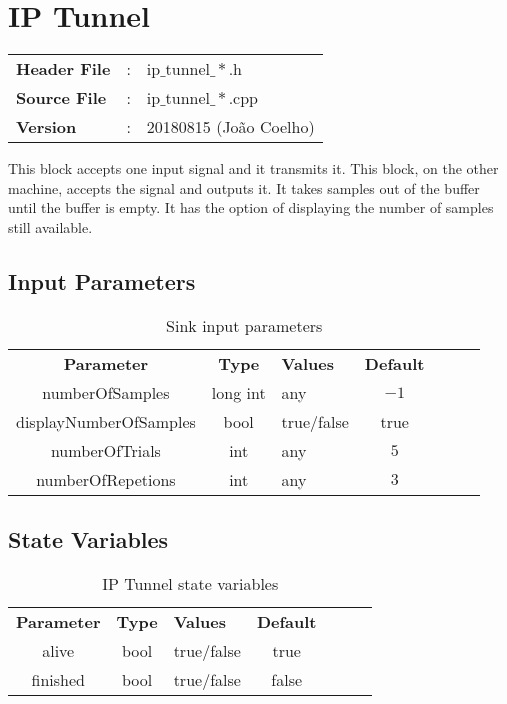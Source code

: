 \clearpage

\section{IP Tunnel}

\begin{tcolorbox}	
	\begin{tabular}{p{2.75cm} p{0.2cm} p{10.5cm}} 	
		\textbf{Header File}   &:& ip$\_$tunnel$\_*$.h \\
		\textbf{Source File}   &:& ip$\_$tunnel$\_*$.cpp \\
        \textbf{Version}       &:& 20180815 (Jo\~ao Coelho) \\
	\end{tabular}
\end{tcolorbox}

This block accepts one input signal and it transmits it. This block, on the other machine, accepts the signal and outputs it. It takes samples out of the buffer until the buffer is empty. It has the option of displaying the number of samples still available.

\subsection*{Input Parameters}

\begin{table}[h]
	\centering
	\begin{tabular}{|c|c|p{30mm}|c|ccp{60mm}}
		\cline{1-4}
		\textbf{Parameter} & \textbf{Type} & \textbf{Values} &   \textbf{Default}& \\ \cline{1-4}
		numberOfSamples & long int & any & $-1$ \\ \cline{1-4}
        displayNumberOfSamples & bool & true/false & true \\ \cline{1-4}
	numberOfTrials & int & any & $5$ \\ \cline{1-4}
	numberOfRepetions & int & any & $3$ \\ \cline{1-4}
	\end{tabular}
	\caption{Sink input parameters}
	\label{table:ipt_in_par}
\end{table}

\subsection*{State Variables}

\begin{table}[h]
	\centering
	\begin{tabular}{|c|c|p{30mm}|c|ccp{60mm}}
		\cline{1-4}
		\textbf{Parameter} & \textbf{Type} & \textbf{Values} &   \textbf{Default}& \\ \cline{1-4}
		alive & bool & true/false & true \\ \cline{1-4}
        finished & bool & true/false & false \\ \cline{1-4}
	
	\end{tabular}
	\caption{IP Tunnel state variables}
	\label{table:iptunnel_st_var}
\end{table}

